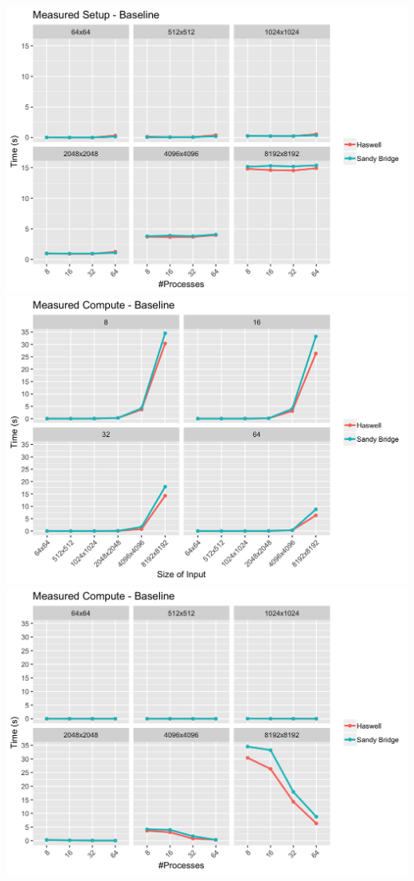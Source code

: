 \documentclass[10pt, letterpaper, twoside]{article}
\begin{document}
\begin{titlepage}
\begin{enumerate}
\includegraphics[scale = 0.18]{Baseline_Measured-Setup_InputSize.png}
\vspace{5mm}
\includegraphics[scale = 0.18]{Baseline_Measured-Compute_Processes.png}
\includegraphics[scale = 0.18]{Baseline_Measured-Compute_InputSize.png}

\end{enumerate}
\end{titlepage}
\end{document}
